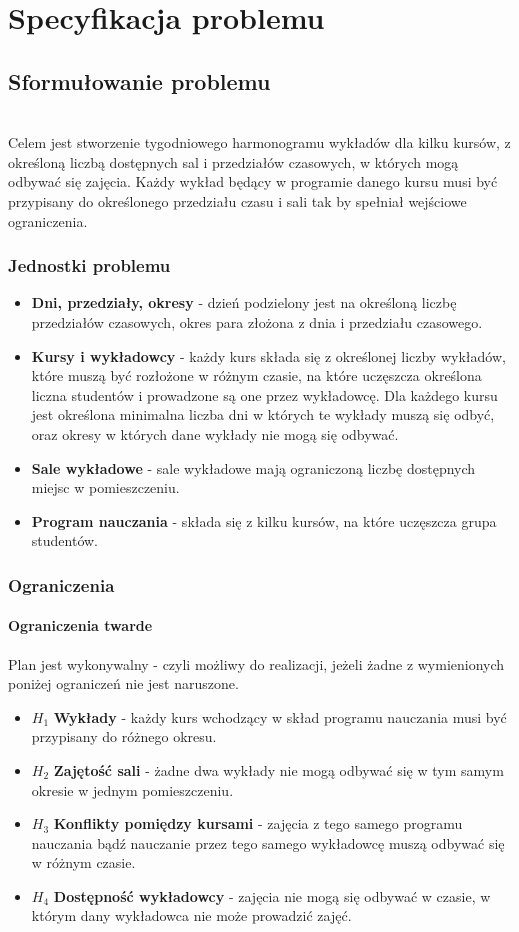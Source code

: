 \documentclass[11pt]{report}
\begin{document}
\chapter{Specyfikacja problemu}
\section{Sformułowanie problemu}
\author{Katarzyna Śmietanka} \\
Celem jest stworzenie tygodniowego harmonogramu wykładów dla kilku kursów, z określoną liczbą dostępnych sal i przedziałów czasowych, w których mogą odbywać się zajęcia. Każdy wykład będący w programie danego kursu musi być przypisany do określonego przedziału czasu i sali tak by spełniał wejściowe ograniczenia. 
\subsection{Jednostki problemu}
\begin{itemize}
\item \textbf{Dni, przedziały, okresy} - dzień podzielony jest na określoną liczbę przedziałów czasowych, okres para złożona z dnia i przedziału czasowego.
\item \textbf{Kursy i wykładowcy} - każdy kurs składa się z określonej liczby wykładów, które muszą być rozłożone w różnym czasie, na które uczęszcza określona liczna studentów i prowadzone są one przez wykładowcę. Dla każdego kursu jest określona minimalna liczba dni w których te wykłady muszą się odbyć, oraz okresy w których dane wykłady nie mogą się odbywać.
\item \textbf{Sale wykładowe} - sale wykładowe mają ograniczoną liczbę dostępnych miejsc w pomieszczeniu.
\item \textbf{Program nauczania} - składa się z kilku kursów, na które uczęszcza grupa studentów.
\end{itemize}
\subsection{Ograniczenia}
\subsubsection{Ograniczenia twarde}
Plan jest wykonywalny - czyli możliwy do realizacji, jeżeli żadne z wymienionych poniżej ograniczeń nie jest naruszone.
\begin{itemize}
\item  ${H_{1}}$ \textbf{Wykłady} - każdy kurs wchodzący w skład programu nauczania musi być przypisany do różnego okresu.
\item  ${H_{2}}$ \textbf{Zajętość sali} - żadne dwa wykłady nie mogą odbywać się w tym samym okresie w jednym pomieszczeniu.
\item  ${H_{3}}$ \textbf{Konflikty pomiędzy kursami} - zajęcia z tego samego programu nauczania bądź nauczanie przez tego samego wykładowcę muszą odbywać się w różnym czasie.
\item  ${H_{4}}$ \textbf{Dostępność wykładowcy} - zajęcia nie mogą się odbywać w czasie, w którym dany wykładowca nie może prowadzić zajęć.
\end{itemize}
\end{document}
